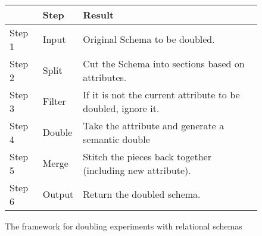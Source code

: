 \documentclass[]{article}
\begin{document}
\begin{figure}[h]
\begin{tikzpicture}[node distance=1cm, on grid]
\end{tikzpicture}
\\[2em]
\begin{tabular}{@{}p{14mm}@{}p{18mm}@{}p{8.8cm}}
    \toprule
    & \textbf {Step} & \textbf {Result} \\
        \midrule
        Step 1 & Input &  Original Schema to be doubled.\\
        Step 2 & Split &  Cut the Schema into sections based on attributes.\\
        Step 3 & Filter &  If it is not the current attribute to be
        doubled, ignore it.\\
        Step 4 & Double &  Take the attribute and generate a semantic double \\
        Step 5 & Merge & Stitch the pieces back together (including new
        attribute).\\
        Step 6 & Output & Return the doubled schema.\\
        \bottomrule
    \end{tabular}\label{tab:trt_datd}
    \caption{The framework for doubling experiments with relational
    schemas}
\end{figure}
\end{document}
